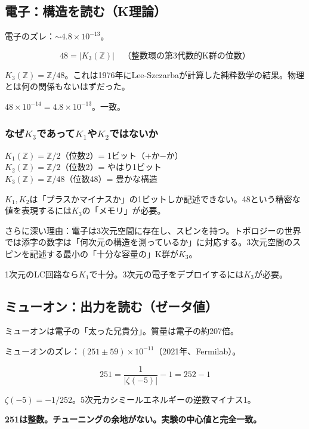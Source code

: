 \documentclass[12pt,a4paper]{article}
\begin{document}
\subsection{電子：構造を読む（K理論）}

電子のズレ：$\sim 4.8 \times 10^{-13}$。

$$48 = |K_3(\mathbb{Z})| \quad \text{（整数環の第3代数的K群の位数）}$$

$K_3(\mathbb{Z}) = \mathbb{Z}/48$。これは1976年にLee-Szczarbaが計算した純粋数学の結果。物理とは何の関係もないはずだった。

$48 \times 10^{-14} = 4.8 \times 10^{-13}$。一致。

\subsubsection{なぜ$K_3$であって$K_1$や$K_2$ではないか}

\begin{mathbox}
$K_1(\mathbb{Z}) = \mathbb{Z}/2$（位数2）= 1ビット（$+$か$-$か）\\
$K_2(\mathbb{Z}) = \mathbb{Z}/2$（位数2）= やはり1ビット\\
$K_3(\mathbb{Z}) = \mathbb{Z}/48$（位数48）= 豊かな構造

$K_1, K_2$は「プラスかマイナスか」の1ビットしか記述できない。48という精密な値を表現するには$K_3$の「メモリ」が必要。

さらに深い理由：電子は3次元空間に存在し、スピンを持つ。トポロジーの世界では添字の数字は「何次元の構造を測っているか」に対応する。3次元空間のスピンを記述する最小の「十分な容量の」K群が$K_3$。

1次元のLC回路なら$K_1$で十分。3次元の電子をデプロイするには$K_3$が必要。
\end{mathbox}

\subsection{ミューオン：出力を読む（ゼータ値）}

ミューオンは電子の「太った兄貴分」。質量は電子の約207倍。

ミューオンのズレ：$(251 \pm 59) \times 10^{-11}$（2021年、Fermilab）。

$$251 = \frac{1}{|\zeta(-5)|} - 1 = 252 - 1$$

$\zeta(-5) = -1/252$。5次元カシミールエネルギーの逆数マイナス1。

\textbf{251は整数。チューニングの余地がない。実験の中心値と完全一致。}
\end{document}
